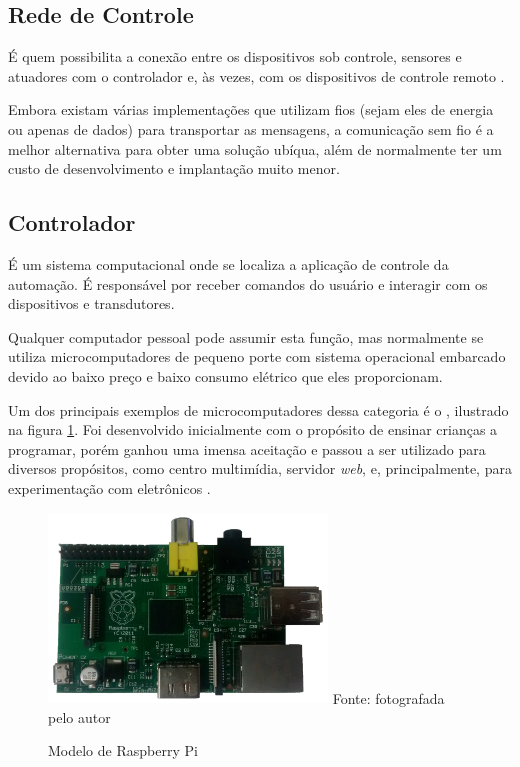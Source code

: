 \subsection{Rede de Controle}
É quem possibilita a conexão entre os dispositivos sob controle, sensores e atuadores com o controlador e, às
vezes, com os dispositivos de controle remoto \cite{kyas2013}.

Embora existam várias implementações que utilizam fios (sejam eles de energia ou apenas de dados) para
transportar as mensagens, a comunicação sem fio é a melhor alternativa para obter uma solução ubíqua, além de
normalmente ter um custo de desenvolvimento e implantação muito menor.

\subsection{Controlador}
É um sistema computacional onde se localiza a aplicação de controle da automação. É responsável por receber comandos do
usuário e interagir com os dispositivos e transdutores.

Qualquer computador pessoal pode assumir esta função, mas normalmente se utiliza microcomputadores de pequeno porte com sistema
operacional embarcado devido ao baixo preço e baixo consumo elétrico que eles proporcionam.

Um dos principais exemplos de microcomputadores dessa categoria é o , ilustrado na figura
\ref{figura:pi}. Foi desenvolvido inicialmente com o propósito de ensinar crianças a programar, porém ganhou uma
imensa aceitação e passou a ser utilizado para diversos propósitos, como centro multimídia, servidor
\textit{web}, e, principalmente, para experimentação com eletrônicos \cite{schmidt2014}.

\begin{figure}[h]
	\centering
	\caption{Modelo de Raspberry Pi}
	\includegraphics[width=280]{../images/raspberry.png}
	\hspace{\linewidth}
	Fonte: fotografada pelo autor
	\label{figura:pi}
\end{figure}


